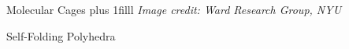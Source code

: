 \documentclass{beamer}
\newcommand{\btVFill}{\vskip0pt plus 1filll}
\begin{document}
\begin{frame}{Molecular Cages}
%
  \centering
\btVFill
\textit{\scriptsize Image credit: Ward Research Group, NYU} 
\end{frame}
\begin{frame}{Self-Folding Polyhedra}
\end{frame}
\end{document}
